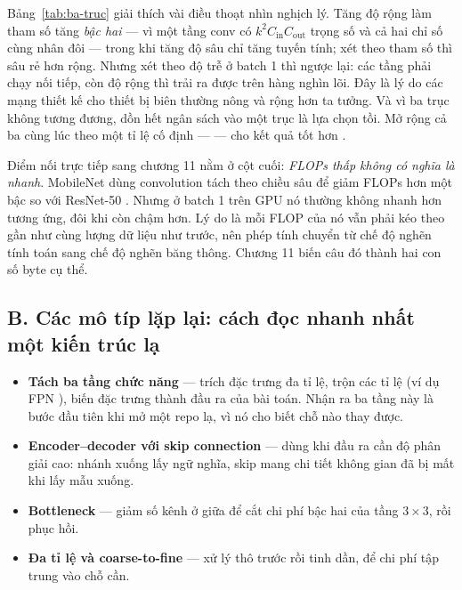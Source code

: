 \documentclass[../../deep_learning.tex]{subfiles}
\begin{document}
Bảng~\ref{tab:ba-truc} giải thích vài điều thoạt nhìn nghịch lý. Tăng độ rộng làm tham số tăng \emph{bậc hai} --- vì một tầng conv có \(k^2 C_{\text{in}} C_{\text{out}}\) trọng số và cả hai chỉ số cùng nhân đôi --- trong khi tăng độ sâu chỉ tăng tuyến tính; xét theo tham số thì sâu rẻ hơn rộng. Nhưng xét theo độ trễ ở batch 1 thì ngược lại: các tầng phải chạy nối tiếp, còn độ rộng thì trải ra được trên hàng nghìn lõi. Đây là lý do các mạng thiết kế cho thiết bị biên thường nông và rộng hơn ta tưởng. Và vì ba trục không tương đương, dồn hết ngân sách vào một trục là lựa chọn tồi. Mở rộng cả ba cùng lúc theo một tỉ lệ cố định ---  --- cho kết quả tốt hơn \cite{tan2019efficientnet}.

Điểm nối trực tiếp sang chương 11 nằm ở cột cuối: \emph{FLOPs thấp không có nghĩa là nhanh}. MobileNet dùng convolution tách theo chiều sâu để giảm FLOPs hơn một bậc so với ResNet-50 \cite{howard2017mobilenets}. Nhưng ở batch 1 trên GPU nó thường không nhanh hơn tương ứng, đôi khi còn chậm hơn. Lý do là mỗi FLOP của nó vẫn phải kéo theo gần như cùng lượng dữ liệu như trước, nên phép tính chuyển từ chế độ nghẽn tính toán sang chế độ nghẽn băng thông. Chương 11 biến câu đó thành hai con số byte cụ thể.

\subsection{B. Các mô típ lặp lại: cách đọc nhanh nhất một kiến trúc lạ}

\begin{itemize}
\item \textbf{Tách ba tầng chức năng} ---  trích đặc trưng đa tỉ lệ,  trộn các tỉ lệ (ví dụ FPN \cite{lin2017fpn}),  biến đặc trưng thành đầu ra của bài toán. Nhận ra ba tầng này là bước đầu tiên khi mở một repo lạ, vì nó cho biết chỗ nào thay được.
\item \textbf{Encoder--decoder với skip connection} \cite{ronneberger2015unet} --- dùng khi đầu ra cần độ phân giải cao: nhánh xuống lấy ngữ nghĩa, skip mang chi tiết không gian đã bị mất khi lấy mẫu xuống.
\item \textbf{Bottleneck} --- giảm số kênh ở giữa để cắt chi phí bậc hai của tầng \(3\times3\), rồi phục hồi.
\item \textbf{Đa tỉ lệ và coarse-to-fine} --- xử lý thô trước rồi tinh dần, để chi phí tập trung vào chỗ cần.
\end{itemize}
\end{document}
